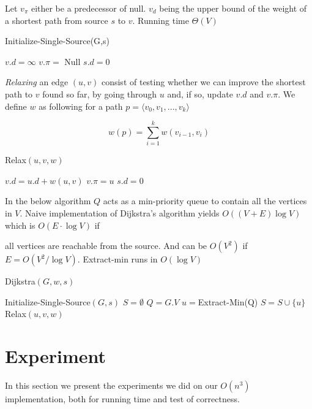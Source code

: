 Let $v_\pi$ either be a predecessor of null. $v_d$ being the upper bound of
the weight of a shortest path from source $s$ to $v$. Running time $\Theta (V)$

\begin{algorithm} 
	\caption{Initialize-Single-Source(G,s)}
	\begin{algorithmic}[1] 
			\State $v.d = \infty$
			\State $v.\pi =$ Null
		\EndFor 
		\State $s.d = 0$ 
	\end{algorithmic} \end{algorithm}

	\emph{Relaxing} an edge $(u,v)$ consist of testing whether we can improve the shortest
path to $v$ found so far, by going through $u$ and, if so, update $v.d$ and
$v.\pi$. We define $w$ as following for a path $p=\langle v_0,v_1,...,v_k
\rangle$

$$ w(p) = \sum_{i=1}^k w(v_{i-1},v_i) $$

\begin{algorithm} 
	\caption{Relax$(u,v,w)$} 
	\begin{algorithmic}[1] 
			\State $v.d=u.d+w(u,v)$ 
			\State $v.\pi = u$ 
		\EndIf 
		\State $s.d = 0$
	\end{algorithmic} 
\end{algorithm}

In the below algorithm $Q$ acts as a min-priority queue to contain all the
	vertices in $V$. Naive implementation of Dijkstra's algorithm yields
	$O((V+E)\log V)$ which is $O(E \cdot \log V)$ if

all vertices are reachable from the source. And can be $O(V^2)$ if
$E=O(V^2/\log V)$. Extract-min runs in $O(\log V)$ 

\begin{algorithm}[H]
	\caption{Dijkstra$(G,w,s)$} 
	\begin{algorithmic}[1] 
		\State Initialize-Single-Source$(G,s)$
		\State $S = \emptyset$ 
		\State $Q = G.V$ 
			\State $u = $Extract-Min(Q) 
			\State $S = S \cup \{u\}$
				\State Relax$(u,v,w)$
			\EndFor 
		\EndWhile
	\end{algorithmic} 
\end{algorithm}

\section{Experiment}
In this section we present the experiments we did on our $O(n^3)$ implementation,
both for running time and test of correctness.


